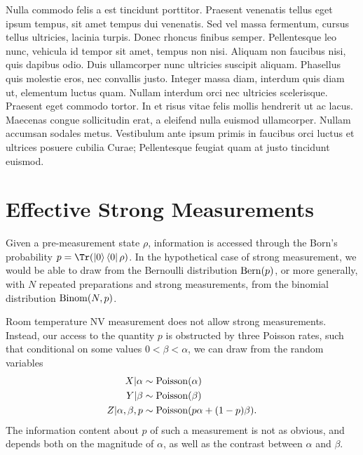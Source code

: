 \documentclass{quantumarticle}
\begin{document}
Nulla commodo felis a est tincidunt porttitor. Praesent venenatis tellus eget ipsum tempus, sit amet tempus dui venenatis. Sed vel massa fermentum, cursus tellus ultricies, lacinia turpis. Donec rhoncus finibus semper. Pellentesque leo nunc, vehicula id tempor sit amet, tempus non nisi. Aliquam non faucibus nisi, quis dapibus odio. Duis ullamcorper nunc ultricies suscipit aliquam. Phasellus quis molestie eros, nec convallis justo. Integer massa diam, interdum quis diam ut, elementum luctus quam. Nullam interdum orci nec ultricies scelerisque. Praesent eget commodo tortor. In et risus vitae felis mollis hendrerit ut ac lacus. Maecenas congue sollicitudin erat, a eleifend nulla euismod ullamcorper. Nullam accumsan sodales metus. Vestibulum ante ipsum primis in faucibus orci luctus et ultrices posuere cubilia Curae; Pellentesque feugiat quam at justo tincidunt euismod. 


\acknowledgments{
    
}

\nocite{apsrev41Control}




\appendix
\onecolumngrid

\section{Effective Strong Measurements}
\label{apx:effective-strong-measurements}

Given a pre-measurement state $\rho$, information is accessed through the
Born's probability $p=\Tr(\ketbra{0}\rho)$.
In the hypothetical case of strong measurement, we would be able to draw from 
the Bernoulli distribution $\operatorname{Bern}(p)$, or more generally, with 
$N$ repeated preparations and strong measurements, from 
the binomial distribution $\operatorname{Binom}(N,p)$.

Room temperature NV measurement does not allow strong measurements. 
Instead, our access to the quantity $p$ is obstructed by three Poisson rates,
such that conditional on some values $0<\beta<\alpha$, we can 
draw from the random variables
\begin{align}
    X|\alpha &\sim \operatorname{Poisson}(\alpha) \nonumber \\
    Y|\beta &\sim \operatorname{Poisson}(\beta) \nonumber \\
    Z|\alpha,\beta,p &\sim \operatorname{Poisson}(p\alpha + (1-p)\beta).
\end{align}
The information content about $p$ of such a measurement is not as obvious, 
and depends both on the magnitude of $\alpha$, as well as the contrast between 
$\alpha$ and $\beta$.
\end{document}
